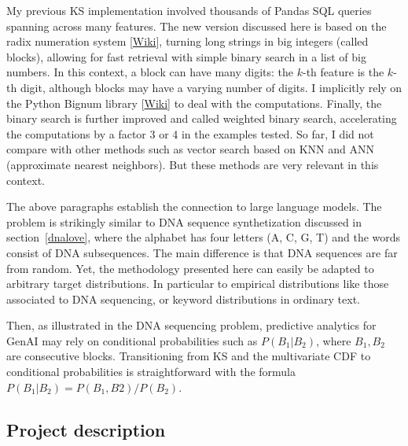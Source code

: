 \documentclass[oneside,10pt]{book}
\begin{document}
My previous KS implementation involved thousands of Pandas SQL queries spanning across many
 features. The new version discussed here is based on the 
\textcolor{index}{radix numeration system} [\href{https://en.wikipedia.org/wiki/Radix}{Wiki}], turning long strings in big integers (called blocks), allowing
 for fast retrieval with simple \textcolor{index}{binary search} in a list of big numbers. In this context, a block can have many digits: the $k$-th feature is the $k$-th digit, although blocks may have a varying number of digits. I implicitly rely on the Python
 \textcolor{index}{Bignum library} [\href{https://en.wikipedia.org/wiki/Arbitrary-precision_arithmetic}{Wiki}] to deal with the computations. Finally, the binary search is further improved and called 
\textcolor{index}{weighted binary search}, accelerating the computations by a factor 3 or 4 in the examples tested.
 So far, I did not compare with other methods such as \textcolor{index}{vector search} 
 based on KNN and ANN (approximate nearest neighbors). But these methods are very relevant in this context.
\vspace{1ex}


\noindent The above paragraphs establish the connection to large language models. 
 The problem is strikingly similar to DNA sequence synthetization discussed in section~\ref{dnalove}, where the alphabet has 
 four letters (A, C, G, T) and the words consist of DNA subsequences. The main difference is that DNA sequences are far from random. Yet,
 the methodology presented here can easily be adapted to arbitrary target distributions. In particular to empirical distributions 
like those associated to DNA sequencing, or keyword distributions in ordinary text.

Then, as illustrated in the DNA sequencing problem, predictive analytics for GenAI may rely on conditional probabilities such as $P(B_1 | B_2)$, where $B_1, B_2$ are consecutive blocks. 
Transitioning from KS and the multivariate CDF to conditional probabilities is straightforward with the formula   
$P(B_1 | B_2) = P(B_1, B2)/P(B_2)$.



\subsection{Project description}
\end{document}
